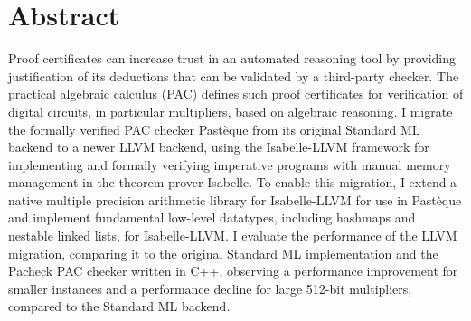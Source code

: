 \section*{Abstract}

Proof certificates can increase trust in an automated reasoning tool by providing justification of its deductions that can be validated by a third-party checker.
The practical algebraic calculus (PAC) defines such proof certificates for verification of digital circuits, in particular multipliers, based on algebraic reasoning.
I migrate the formally verified PAC checker Pastèque from its original Standard ML backend to a newer LLVM backend, using the Isabelle-LLVM framework for implementing and formally verifying imperative programs with manual memory management in the theorem prover Isabelle.
To enable this migration, I extend a native multiple precision arithmetic library for Isabelle-LLVM for use in Pastèque and implement fundamental low-level datatypes, including hashmaps and nestable linked lists, for Isabelle-LLVM.
I evaluate the performance of the LLVM migration, comparing it to the original Standard ML implementation and the Pacheck PAC checker written in C++, observing a performance improvement for smaller instances and a performance decline for large 512-bit multipliers, compared to the Standard ML backend.
